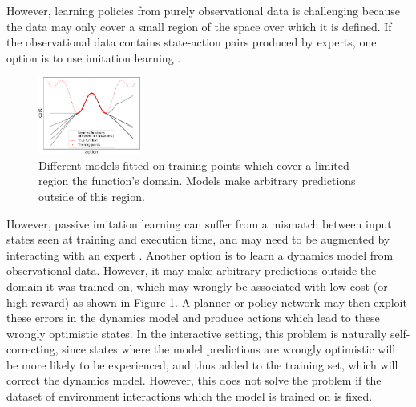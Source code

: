 \documentclass{article} %
\begin{document}
However, learning policies from purely observational data is challenging because the data may only cover a small region of the space over which it is defined. If the observational data contains state-action pairs produced by experts, one option is to use imitation learning \citep{Pomerleau91}.
\begin{figure}
  \includegraphics[width=0.3\textwidth]{figures/driving/uncertainty_example2-crop.pdf}
  \caption{\label{simple-example}Different models fitted on training points which cover a limited region the function's domain. Models make arbitrary predictions outside of this region.}
\end{figure}

However, passive imitation learning can suffer from a mismatch between input states seen at training and execution time, and may need to be augmented by interacting with an expert \citep{Dagger}.
Another option is to learn a dynamics model from observational data. However, it may make arbitrary predictions outside the domain it was trained on, which may wrongly be associated with low cost (or high reward) as shown in Figure \ref{simple-example}. A planner or policy network may then exploit these errors in the dynamics model and produce actions which lead to these wrongly optimistic states.
In the interactive setting, this problem is naturally self-correcting, since states where the model predictions are wrongly optimistic will be more likely to be experienced, and thus added to the training set, which will correct the dynamics model. However, this does not solve the problem if the dataset of environment interactions which the model is trained on is fixed.
\end{document}
